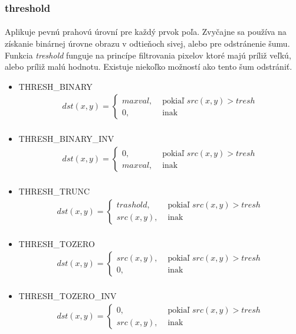 \documentclass[12pt]{article}
\begin{document}
\subsubsection{threshold}
\paragraph{}
Aplikuje pevnú prahovú úrovní pre každý prvok poľa. Zvyčajne sa používa na získanie binárnej úrovne obrazu v odtieňoch sivej, alebo pre odstránenie šumu.
Funkcia \emph{treshold} funguje na princípe filtrovania pixelov ktoré majú príliž veľkú, alebo príliž malú hodnotu. Existuje niekoľko možností ako tento šum odstrániť.
\begin{itemize}
  \item THRESH\_BINARY
	\begin{align*}
	dst(x,y) = \begin{cases} maxval, & \text{ pokiaľ } src(x,y) > tresh \\ 0, & \text{ inak } \end{cases} \\
	\end{align*}
  \item THRESH\_BINARY\_INV
  	\begin{align*}
	dst(x,y) = \begin{cases} 0, & \text{ pokiaľ } src(x,y) > tresh \\ maxval, & \text{ inak } \end{cases} \\
	\end{align*}
  \item THRESH\_TRUNC
  	\begin{align*}
	dst(x,y) = \begin{cases} trashold, & \text{ pokiaľ } src(x,y) > tresh \\ src(x,y), & \text{ inak } \end{cases} \\
	\end{align*}
  \item THRESH\_TOZERO
  	\begin{align*}
	dst(x,y) = \begin{cases}  src(x,y), & \text{ pokiaľ } src(x,y) > tresh \\ 0, & \text{ inak } \end{cases} \\
	\end{align*}
  \item THRESH\_TOZERO\_INV
  	\begin{align*}
	dst(x,y) = \begin{cases} 0, & \text{ pokiaľ } src(x,y) > tresh \\  src(x,y), & \text{ inak } \end{cases} \\
	\end{align*}
\end{itemize}
\end{document}
